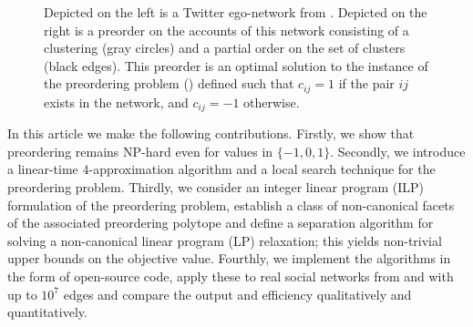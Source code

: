 \begin{figure}
    \centering
    \hspace{5ex}
    
    \caption{Depicted on the left is a Twitter ego-network from \citet{leskovec2012learning}. 
    Depicted on the right is a preorder on the accounts of this network consisting of a clustering (gray circles) and a partial order on the set of clusters (black edges).
	This preorder is an optimal solution to the instance of the preordering problem () defined such that $c_{ij} = 1$ if the pair $ij$ exists in the network, and $c_{ij} = -1$ otherwise.}
    \label{fig:twitter-example}
\end{figure}

In this article we make the following contributions.
Firstly, we show that preordering remains \textsc{NP}-hard even for values in $\{-1,0,1\}$.
Secondly, we introduce a linear-time $4$-approximation algorithm and a local search technique for the preordering problem.
Thirdly, we consider an integer linear program (ILP) formulation of the preordering problem, establish a class of non-canonical facets of the associated preordering polytope and define a separation algorithm for solving a non-canonical linear program (LP) relaxation; this yields non-trivial upper bounds on the objective value.
Fourthly, we implement the algorithms in the form of open-source code, apply these to real social networks from \citet{fink2023centrality} and \citet{leskovec2012learning} with up to $10^7$ edges and compare the output and efficiency qualitatively and quantitatively.
